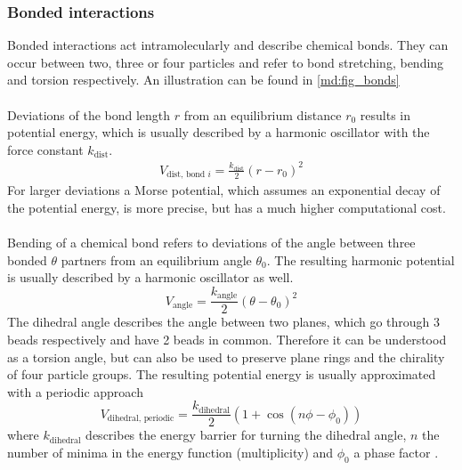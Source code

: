 \subsubsection{Bonded interactions}
Bonded interactions act intramolecularly and describe chemical bonds. They can occur between two, three or four particles and refer to bond stretching, bending and torsion respectively. An illustration can be found in \autoref{md:fig_bonds}\\
\\
Deviations of the bond length $r$ from an equilibrium distance $r_0$ results in potential energy, which is usually described by a harmonic oscillator with the force constant $k_\text{dist}$.
\begin{align}
V_{\text{dist, bond }i} = \frac{k_{\text{dist}}}{2}\left( r - r_{0} \right)^2
\end{align}
For larger deviations a Morse potential, which assumes an exponential decay of the potential energy, is more precise, but has a much higher computational cost.\\
\\
Bending of a chemical bond refers to deviations of the angle between three bonded $\theta$ partners from an equilibrium angle $\theta_0$. The resulting harmonic potential is usually described by a harmonic oscillator as well.
\begin{equation}
V_\text{angle} = \frac{k_\text{angle}}{2}\left( \theta - \theta_0 \right)^2
\end{equation}
The dihedral angle describes the angle between two planes, which go through 3 beads respectively and have 2 beads in common. Therefore it can be understood as a torsion angle, but can also be used to preserve plane rings and the chirality of four particle groups. The resulting potential energy is usually approximated with a periodic approach
\begin{equation}
V_{\text{dihedral, periodic}} = \frac{k_\text{dihedral}}{2}\left(1 + \cos\left(n \phi - \phi_0 \right)\right)
\end{equation}
where $k_\text{dihedral}$ describes the energy barrier for turning the dihedral angle, $n$ the number of minima in the energy function (multiplicity) and $\phi_0$ a phase factor \autocite[p. 71-83]{gromacsManual}.
%
%
%
